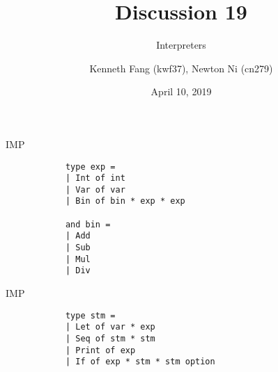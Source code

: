 \documentclass{beamer}
\title{Discussion 19}
\subtitle{Interpreters}
\author{Kenneth Fang (kwf37), Newton Ni (cn279)}
\date{April 10, 2019}
\begin{document}
    \begin{frame}
        \titlepage{}
    \end{frame}

    \begin{frame}[fragile=singleslide]{IMP}
        \begin{verbatim}
            type exp =         
            | Int of int
            | Var of var
            | Bin of bin * exp * exp

            and bin =
            | Add
            | Sub
            | Mul
            | Div
        \end{verbatim}
    \end{frame}

    \begin{frame}[fragile=singleslide]{IMP}
        \begin{verbatim}
            type stm =         
            | Let of var * exp
            | Seq of stm * stm
            | Print of exp
            | If of exp * stm * stm option
        \end{verbatim}
    \end{frame}
\end{document}
